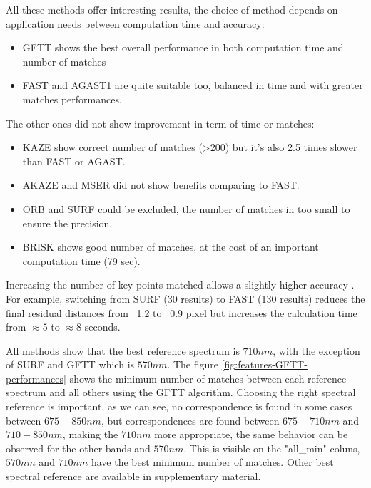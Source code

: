 \documentclass[]{elsarticle}
\begin{document}
	All these methods offer interesting results, the choice of method depends on application needs between computation time and accuracy:
	\begin{itemize}
		\item GFTT shows the best overall performance in both computation time and number of matches
		\item FAST and AGAST1 are quite suitable too, balanced in time and with greater matches performances.
	\end{itemize}
	
	\noindent
	The other ones did not show improvement in term of time or matches:
	\begin{itemize}
		\item KAZE show correct number of matches (>200) but it's also 2.5 times slower than FAST or AGAST.
		\item AKAZE and MSER did not show benefits comparing to FAST.
		\item ORB and SURF could be excluded, the number of matches in too small to ensure the precision.
		\item BRISK shows good number of matches, at the cost of an important computation time (79 sec).
	\end{itemize}
	
	\par Increasing the number of key points matched allows a slightly higher accuracy \cite{DantasDiasJunior}.
	For example, switching from SURF (30 results) to FAST (130 results) reduces the final residual distances from ~1.2 to ~0.9 pixel but increases the calculation time from $\approx 5$ to $\approx 8$ seconds.
	\\
	\par All methods show that the best reference spectrum is $710nm$, with the exception of SURF and GFTT which is $570nm$.
	The figure \ref{fig:features-GFTT-performances} shows the minimum number of matches between each reference spectrum and all others using the GFTT algorithm.
	Choosing the right spectral reference is important, as we can see, no correspondence is found in some cases between $675-850nm$,
	but correspondences are found between $675-710nm$ and $710-850nm$, making the $710nm$ more appropriate,
	the same behavior can be observed for the other bands and $570nm$.
	This is visible on the "all\_min" coluns, $570nm$ and $710nm$ have the best minimum number of matches.
	Other best spectral reference are available in supplementary material.
	
\end{document}
